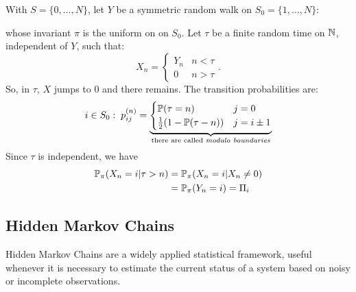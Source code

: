 \documentclass{article}
\begin{document}
\begin{example}
    With $S=\{0,\dots,N\}$, let $Y$ be a symmetric random walk on $S_0=\{1,\ldots,N\}$:
\begin{figure}[H]
    \centering
    \label{symmrw}
\end{figure} whose invariant $\pi$ is the uniform on on $S_0$. Let $\tau$ be a finite random time on $\mathbb{N}$, independent of $Y$, such that:
\[
X_n=\begin{cases}
    Y_n &n<\tau\\
    0 &n>\tau
\end{cases}.
\]
So, in $\tau$, $X$ jumps to 0 and there remains. The transition probabilities are:
\[
i \in S_0:\;p_{ij}^{(n)}=\underbrace{\begin{cases}
    \mathbb{P}(\tau=n)&j=0\\
    \frac{1}{2}(1-\mathbb{P}(\tau-n)) &j=i\pm 1
\end{cases}}_{\text{there are called \textit{modulo boundaries}}}
\]
Since $\tau$ is independent, we have 
\begin{align*}
    \mathbb{P}_{\pi}(X_n=i|\tau>n)&=\mathbb{P}_{\pi}(X_n=i|X_n\neq0)\\
    &=\mathbb{P}_{\pi}(Y_n=i)=\Pi_i
\end{align*}
\end{example}
\subsection{Hidden Markov Chains}
Hidden Markov Chains are a widely applied statistical framework, useful whenever it is necessary to estimate the current status of a system based on noisy or incomplete observations.
\end{document}
